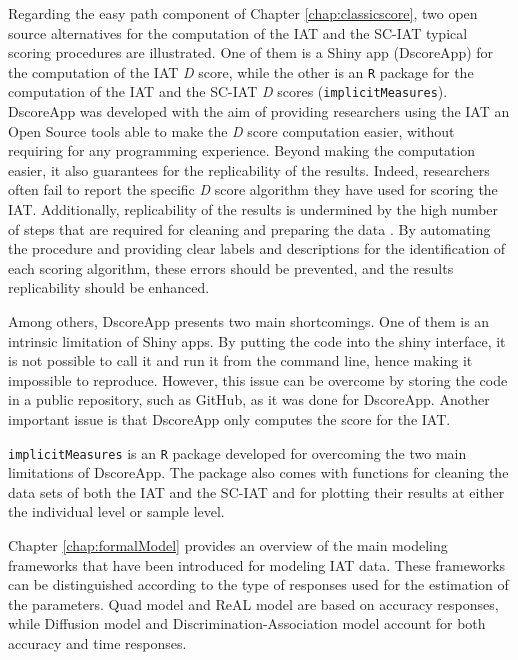 \documentclass[12pt]{book}
\begin{document}
Regarding the easy path component of Chapter \ref{chap:classicscore}, two open source alternatives for the computation of the IAT and the SC-IAT typical scoring procedures are illustrated. 
One of them is a Shiny app (DscoreApp) for the computation of the IAT \emph{D} score, while the other is an \verb*|R| package for the computation of the IAT and the SC-IAT \emph{D} scores (\verb*|implicitMeasures|). 
DscoreApp was developed with the aim of providing researchers using the IAT an Open Source tools able to make the \emph{D} score computation easier, without requiring for any programming experience. Beyond making the computation easier, it also guarantees for the replicability of the results. Indeed, researchers often fail to report the specific \emph{D} score algorithm they have used for scoring the IAT. 
Additionally, replicability of the results is undermined by the high number of steps that are required for cleaning and preparing the data \cite{ellithorpe2015}.
By automating the procedure and providing clear labels and descriptions for the identification of each scoring algorithm, these errors should be prevented, and the results replicability should be enhanced.

Among others, DscoreApp presents two main shortcomings. One of them is an intrinsic limitation of Shiny apps. 
By putting the code into the shiny interface, it is not possible to call it and run it from the command line, hence making it impossible to reproduce. 
However, this issue can be overcome by storing the code in a public repository, such as GitHub, as it was done for DscoreApp.
Another important issue is that DscoreApp only computes the score for the IAT. 

\verb*|implicitMeasures| is an \verb*|R| package developed for overcoming the two main limitations of DscoreApp. The package also comes with functions for cleaning the data sets of both the IAT and the SC-IAT and for plotting their results at either the individual level or sample level.

Chapter \ref{chap:formalModel} provides an overview of the main modeling frameworks that have been introduced for modeling IAT data. 
These frameworks can be distinguished according to the type of responses used for the estimation of the parameters. 
Quad model \cite{Conrey2005} and ReAL model \cite{Meissner2013} are based on accuracy responses, while Diffusion model \cite{Klauer2007} and Discrimination-Association model \cite{stefanutti2013} account for both accuracy and time responses. 
\end{document}
